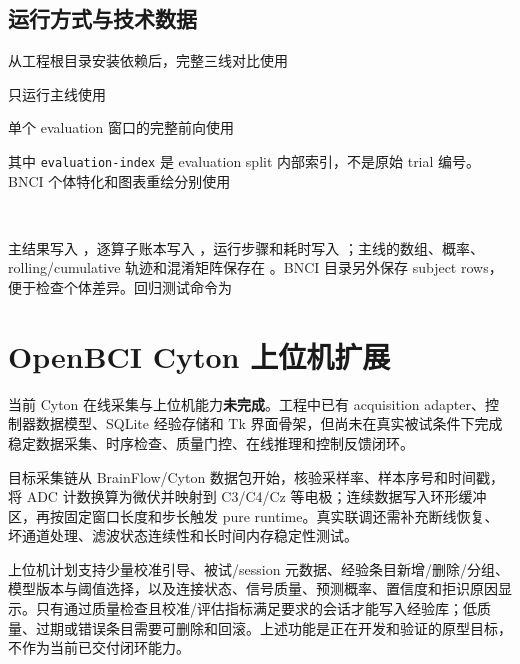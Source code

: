 \documentclass[
    TwoSide=false,
    Degree=graduate,
    GradLevel=master,
    Type=thesis,
    Title={光电混合运动想象脑机接口技术文档}
]{zjuthesis}
\begin{document}
\section{运行方式与技术数据}
从工程根目录安装依赖后，完整三线对比使用
\begin{center}\small\texttt{}\end{center}
只运行主线使用
\begin{center}\small\texttt{}\end{center}
单个 evaluation 窗口的完整前向使用
\begin{center}\small\texttt{}\end{center}
其中 \texttt{evaluation-index} 是 evaluation split 内部索引，不是原始 trial 编号。BNCI 个体特化和图表重绘分别使用
\begin{center}\small
\texttt{}\\
\texttt{}
\end{center}

主结果写入 ，逐算子账本写入 ，运行步骤和耗时写入 ；主线的数组、概率、rolling/cumulative 轨迹和混淆矩阵保存在 。BNCI 目录另外保存 subject rows，便于检查个体差异。回归测试命令为
\begin{center}\small\texttt{}\end{center}

\chapter{OpenBCI Cyton 上位机扩展}
当前 Cyton 在线采集与上位机能力\textbf{未完成}。工程中已有 acquisition adapter、控制器数据模型、SQLite 经验存储和 Tk 界面骨架，但尚未在真实被试条件下完成稳定数据采集、时序检查、质量门控、在线推理和控制反馈闭环。

目标采集链从 BrainFlow/Cyton 数据包开始，核验采样率、样本序号和时间戳，将 ADC 计数换算为微伏并映射到 C3/C4/Cz 等电极；连续数据写入环形缓冲区，再按固定窗口长度和步长触发 pure runtime。真实联调还需补充断线恢复、坏通道处理、滤波状态连续性和长时间内存稳定性测试。

上位机计划支持少量校准引导、被试/session 元数据、经验条目新增/删除/分组、模型版本与阈值选择，以及连接状态、信号质量、预测概率、置信度和拒识原因显示。只有通过质量检查且校准/评估指标满足要求的会话才能写入经验库；低质量、过期或错误条目需要可删除和回滚。上述功能是正在开发和验证的原型目标，不作为当前已交付闭环能力。
\end{document}
